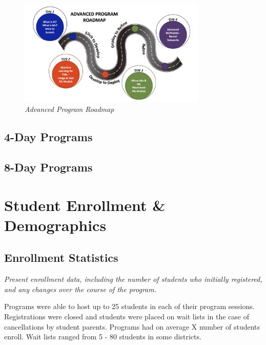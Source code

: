\documentclass[
]{article}
\begin{document}
\begin{figure}
\centering
\includegraphics[width=0.8\textwidth,height=\textheight]{Images/GGEE_23_Adv_roadmap.jpg}
\caption{\emph{Advanced Program Roadmap}}
\end{figure}

\hypertarget{day-programs}{%
\subsection{4-Day Programs}\label{day-programs}}

\hypertarget{day-programs-1}{%
\subsection{8-Day Programs}\label{day-programs-1}}

\hypertarget{student-enrollment-demographics}{%
\section{Student Enrollment \&
Demographics}\label{student-enrollment-demographics}}

\hypertarget{enrollment-statistics}{%
\subsection{Enrollment Statistics}\label{enrollment-statistics}}

\emph{Present enrollment data, including the number of students who
initially registered, and any changes over the course of the program.}

Programs were able to host up to 25 students in each of their program
sessions. Registrations were closed and students were placed on wait
lists in the case of cancellations by student parents. Programs had on
average X number of students enroll. Wait lists ranged from 5 - 80
students in some districts.
\end{document}
